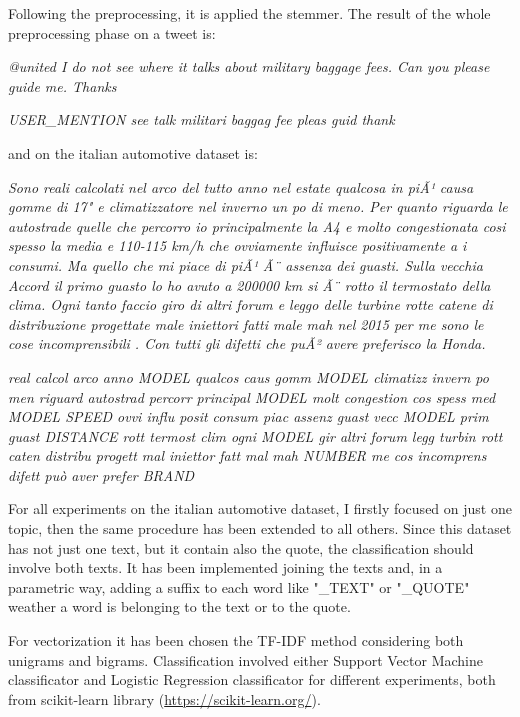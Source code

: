 Following the preprocessing, it is applied the stemmer. The result of the whole preprocessing phase on a tweet is:

\begin{description}
	\item \textit{@united I do not see where it talks about military baggage fees. Can you please guide me. Thanks}
	\item \textit{USER\_MENTION see talk militari baggag fee  pleas guid  thank
	}
\end{description}

and on the italian automotive dataset is:

\begin{description}
	\item \textit{Sono reali calcolati nel arco del tutto anno nel estate qualcosa in piÃ¹ causa gomme di 17" e climatizzatore nel inverno un po di meno. Per quanto riguarda le autostrade quelle che percorro io principalmente la A4 e molto congestionata cosi spesso la media e 110-115 km/h che ovviamente influisce positivamente a i consumi. Ma quello che mi piace di piÃ¹ Ã¨ assenza dei guasti. Sulla vecchia Accord il primo guasto lo ho avuto a 200000 km si Ã¨ rotto il termostato della clima. Ogni tanto faccio giro di altri forum e leggo delle turbine rotte catene di distribuzione progettate male iniettori fatti male mah nel 2015 per me sono le cose incomprensibili . Con tutti gli difetti che puÃ² avere preferisco la Honda. }
	
	\item \textit{real calcol arco anno MODEL qualcos caus gomm MODEL climatizz invern po men riguard autostrad percorr principal MODEL molt congestion cos spess med MODEL SPEED ovvi influ posit consum piac assenz guast vecc MODEL prim guast DISTANCE rott termost clim ogni MODEL gir altri forum legg turbin rott caten distribu progett mal iniettor fatt mal mah NUMBER me cos incomprens difett può aver prefer BRAND}
\end{description}

For all experiments on the italian automotive dataset, I firstly focused on just one topic, then the same procedure has been extended to all others. Since this dataset has not just one text, but it contain also the quote, the classification should involve both texts. It has been implemented joining the texts and, in a parametric way, adding a suffix to each word like "\_TEXT" or "\_QUOTE" weather a word is belonging to the text or to the quote.

For vectorization it has been chosen the TF-IDF method considering both unigrams and bigrams. Classification involved either Support Vector Machine classificator and Logistic Regression classificator for different experiments, both from scikit-learn library (\url{https://scikit-learn.org/}).


